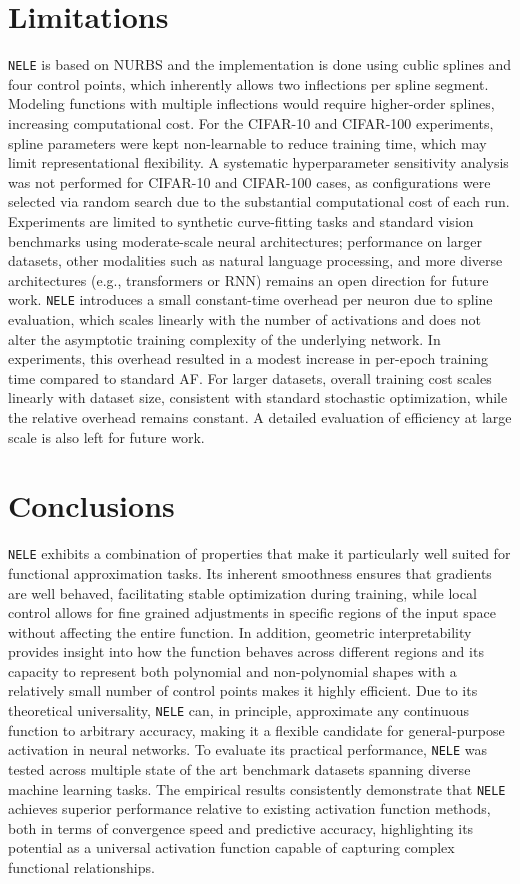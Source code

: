 \documentclass{article}
\begin{document}
\section{Limitations}
\texttt{NELE} is based on NURBS and the implementation is done using cublic splines and four control points, 
which inherently allows two inflections per spline segment. Modeling functions with multiple inflections 
would require higher-order splines, increasing computational cost. 
For the CIFAR-10 and CIFAR-100 experiments, spline parameters were kept non-learnable to reduce 
training time, which may limit representational flexibility. 
A systematic hyperparameter sensitivity analysis was not performed for CIFAR-10 and CIFAR-100 cases, 
as configurations were selected via random search due to the substantial computational cost of each run. 
Experiments are limited to synthetic curve-fitting tasks and standard vision benchmarks using moderate-scale neural 
architectures; performance on larger datasets, 
other modalities such as natural language processing, 
and more diverse architectures (e.g., transformers or RNN) remains an open direction for future work.
\texttt{NELE} introduces a small constant-time overhead per neuron due to spline evaluation, 
which scales linearly with the number of activations and does not alter the asymptotic training complexity of the 
underlying network. In experiments, this overhead resulted in a modest increase in per-epoch training time 
compared to standard AF. For larger datasets, overall training cost scales linearly with dataset size, 
consistent with standard stochastic optimization, while the relative overhead remains constant. 
A detailed evaluation of efficiency at large scale is also left for future work.
\section{Conclusions}
\texttt{NELE} exhibits a combination of properties that make it particularly 
well suited for functional approximation tasks. 
Its inherent smoothness ensures that gradients are well behaved, 
facilitating stable optimization during training, 
while local control allows for fine grained adjustments in specific 
regions of the input space without affecting the entire function. 
In addition, geometric interpretability provides insight into 
how the function behaves across different regions and its capacity to 
represent both polynomial and non-polynomial shapes with a relatively 
small number of control points makes it highly efficient. 
Due to its theoretical universality, \texttt{NELE} can, in principle, 
approximate any continuous function to arbitrary accuracy, 
making it a flexible candidate for general-purpose activation in neural networks. 
To evaluate its practical performance, \texttt{NELE} was tested across multiple 
state of the art benchmark datasets spanning diverse machine 
learning tasks. The empirical results consistently demonstrate that 
\texttt{NELE} achieves superior performance relative to existing activation 
function methods, both in terms of convergence speed and predictive accuracy, 
highlighting its potential as a universal activation function capable of 
capturing complex functional relationships.
\end{document}
